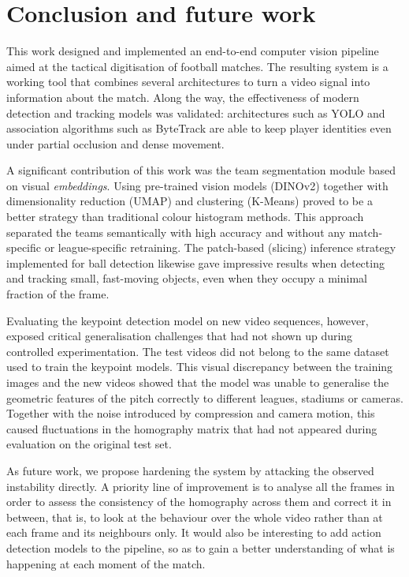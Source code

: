 \section{Conclusion and future work}

This work designed and implemented an end-to-end computer vision pipeline aimed at the tactical digitisation of football matches. The resulting system is a working tool that combines several architectures to turn a video signal into information about the match. Along the way, the effectiveness of modern detection and tracking models was validated: architectures such as YOLO and association algorithms such as ByteTrack are able to keep player identities even under partial occlusion and dense movement.

A significant contribution of this work was the team segmentation module based on visual \textit{embeddings}. Using pre-trained vision models (DINOv2) together with dimensionality reduction (UMAP) and clustering (K-Means) proved to be a better strategy than traditional colour histogram methods. This approach separated the teams semantically with high accuracy and without any match-specific or league-specific retraining. The patch-based (slicing) inference strategy implemented for ball detection likewise gave impressive results when detecting and tracking small, fast-moving objects, even when they occupy a minimal fraction of the frame.

Evaluating the keypoint detection model on new video sequences, however, exposed critical generalisation challenges that had not shown up during controlled experimentation. The test videos did not belong to the same dataset used to train the keypoint models. This visual discrepancy between the training images and the new videos showed that the model was unable to generalise the geometric features of the pitch correctly to different leagues, stadiums or cameras. Together with the noise introduced by compression and camera motion, this caused fluctuations in the homography matrix that had not appeared during evaluation on the original test set.

As future work, we propose hardening the system by attacking the observed instability directly. A priority line of improvement is to analyse all the frames in order to assess the consistency of the homography across them and correct it in between, that is, to look at the behaviour over the whole video rather than at each frame and its neighbours only. It would also be interesting to add action detection models to the pipeline, so as to gain a better understanding of what is happening at each moment of the match.
